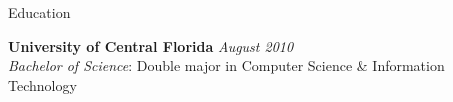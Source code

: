 \documentclass{resume} %
\begin{document}

\begin{rSection}{Education}

{\bf University of Central Florida} \hfill {\em August 2010} \\ 
\textit{Bachelor of Science}: Double major in Computer Science \& Information Technology \\

\end{rSection}





\end{document}
